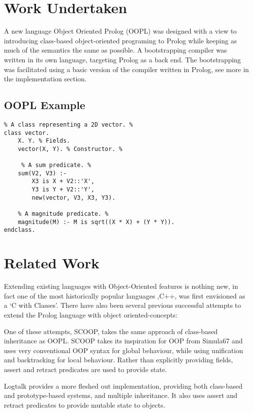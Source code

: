 \documentclass[12pt,a4paper,twoside,openright]{report}
\begin{document}
\section{Work Undertaken}

A new language Object Oriented Prolog (OOPL) was designed with a view to introducing class-based object-oriented programing to Prolog while keeping as much of the semantics the same as possible. A bootstrapping compiler was written in its own language, targeting Prolog as a back end. The bootstrapping was facilitated using a basic version of the compiler written in Prolog, see more in the implementation section.

\subsection {OOPL Example}

\begin{lstlisting}
% A class representing a 2D vector. %
class vector. 
	X. Y. % Fields.
	vector(X, Y). % Constructor. %
	
	 % A sum predicate. %
	sum(V2, V3) :- 
		X3 is X + V2::'X',
		Y3 is Y + V2::'Y',
		new(vector, V3, X3, Y3).
		
	% A magnitude predicate. %
	magnitude(M) :- M is sqrt((X * X) + (Y * Y)). 
endclass.
\end{lstlisting}

\section{Related Work}

Extending existing languages with Object-Oriented features is nothing new, in fact one of the most historically popular languages ,C++, was first envisioned as a `C with Classes'\cite{CPP}. There have also been several previous successful attempts to extend the Prolog language with object oriented-concepts:

\bigskip

One of these attempts, SCOOP\cite{SCOOP},  takes the same approach of class-based inheritance as OOPL\@. SCOOP takes its inspiration for OOP from Simula67 and uses very conventional OOP syntax for global behaviour, while using unification and backtracking for local behaviour. Rather than explicitly providing fields, assert and retract predicates are used to provide state.

\bigskip

Logtalk\cite{LOGTALK} provides a more fleshed out implementation, providing both class-based and prototype-based systems, and multiple inheritance. It also uses assert and retract predicates to provide mutable state to objects. 
\end{document}
